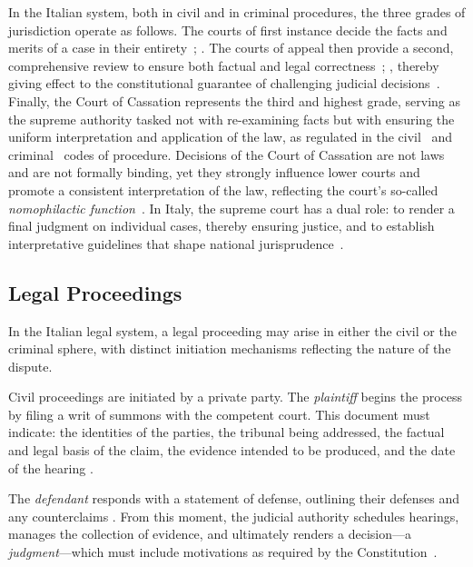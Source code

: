 In the Italian system, both in civil and in criminal procedures, the three grades of jurisdiction operate as follows. The courts of first instance decide the facts and merits of a case in their entirety~\cite[Arts. 99--310]{CPC}; \cite[Arts. 429--544]{CPP}. The courts of appeal then provide a second, comprehensive review to ensure both factual and legal correctness~\cite[Arts. 339--359]{CPC}; \cite[Arts. 593--605]{CPP}, thereby giving effect to the constitutional guarantee of challenging judicial decisions~\cite[Art.~111]{Costituzione}. Finally, the Court of Cassation represents the third and highest grade, serving as the supreme authority tasked not with re-examining facts but with ensuring the uniform interpretation and application of the law, as regulated in the civil~\cite[Art.~360--382]{CPC} and criminal~\cite[Art.~606--613]{CPP} codes of procedure.
Decisions of the Court of Cassation are not laws and are not formally binding, yet they strongly influence lower courts and promote a consistent interpretation of the law, reflecting the court's so-called \emph{nomophilactic function}~\cite{lazovic2022}. In Italy, the supreme court has a dual role: to render a final judgment on individual cases, thereby ensuring justice, and to establish interpretative guidelines that shape national jurisprudence~\cite[Art.~65]{RD1941_12_art65}.


\subsection{Legal Proceedings}

In the Italian legal system, a legal proceeding may arise in either the civil or the criminal sphere, with distinct initiation mechanisms reflecting the nature of the dispute.


Civil proceedings are initiated by a private party. The \emph{plaintiff} begins the process by filing a writ of summons with the competent court. This document must indicate: the identities of the parties, the tribunal being addressed, the factual and legal basis of the claim, the evidence intended to be produced, and the date of the hearing \cite[Art.~163]{CPC}. 

The \emph{defendant} responds with a statement of defense, outlining their defenses and any counterclaims \cite[Art.~167]{CPC}. From this moment, the judicial authority schedules hearings, manages the collection of evidence, and ultimately renders a decision---a \emph{judgment}---which must include motivations as required by the Constitution~\cite[Art.~111]{Costituzione}.

